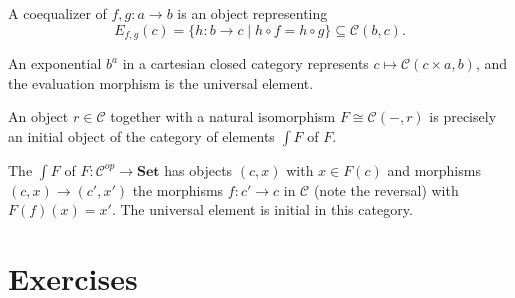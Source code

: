 A coequalizer of $f, g : a \to b$ is an object representing
\[
  E_{f,g}(c) = \{h : b \to c \mid h \circ f = h \circ g\} \subseteq \mathcal{C}(b, c).
\]

An exponential $b^a$ in a cartesian closed category represents
$c \mapsto \mathcal{C}(c \times a, b)$, and the evaluation morphism is the
universal element.

\begin{theorem}
An object $r \in \mathcal{C}$ together with a natural isomorphism
$F \cong \mathcal{C}(-,r)$ is precisely an initial object of the category of
elements $\int F$ of $F$.
\end{theorem}

The  $\int F$ of $F : \mathcal{C}^{op} \to \mathbf{Set}$
has objects $(c, x)$ with $x \in F(c)$ and morphisms $(c,x) \to (c', x')$ the
morphisms $f : c' \to c$ in $\mathcal{C}$ (note the reversal) with $F(f)(x) = x'$.
The universal element is initial in this category.

\section{Exercises}

